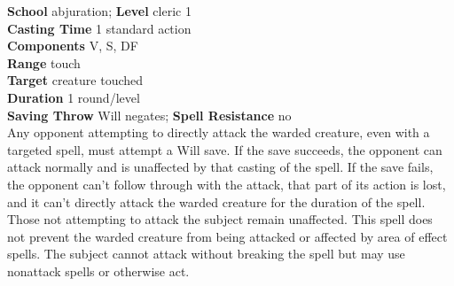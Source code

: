 \textbf{School} abjuration; \textbf{Level} cleric 1\\
\textbf{Casting Time} 1 standard action\\
\textbf{Components} V, S, DF\\
\textbf{Range} touch\\
\textbf{Target} creature touched\\
\textbf{Duration} 1 round/level\\
\textbf{Saving Throw }Will negates; \textbf{Spell Resistance} no\\
Any opponent attempting to directly attack the warded creature, even with a targeted spell, must attempt a Will save. If the save succeeds, the opponent can attack normally and is unaffected by that casting of the spell. If the save fails, the opponent can't follow through with the attack, that part of its action is lost, and it can't directly attack the warded creature for the duration of the spell. Those not attempting to attack the subject remain unaffected. This spell does not prevent the warded creature from being attacked or affected by area of effect spells. The subject cannot attack without breaking the spell but may use nonattack spells or otherwise act.\\
